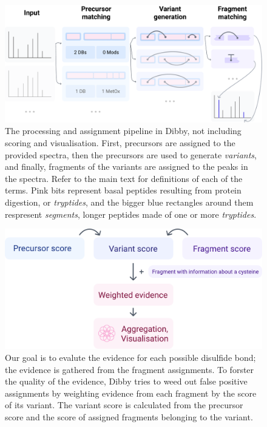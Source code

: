 \begin{figure}
  \centering
  \includegraphics[width=\linewidth]{img/pipeline.pdf}
  \caption{The processing and assignment pipeline in Dibby, not including scoring and visualisation. First, precursors are assigned to the provided spectra, then the precursors are used to generate \emph{variants}, and finally, fragments of the variants are assigned to the peaks in the spectra. Refer to the main text for definitions of each of the terms. Pink bits represent basal peptides resulting from protein digestion, or \emph{tryptides}, and the bigger blue rectangles around them respresent \emph{segments}, longer peptides made of one or more \emph{tryptides}.}\label{fig:pipeline}

\end{figure}

\begin{figure}
  \centering
  \includegraphics[width=0.75\linewidth]{img/score-calculation.pdf}
  \caption{Our goal is to evalute the evidence for each possible disulfide bond; the evidence is gathered from the fragment assignments. To forster the quality of the evidence, Dibby tries to weed out false positive assignments by weighting evidence from each fragment by the score of its variant. The variant score is calculated from the precursor score and the score of assigned fragments belonging to the variant.}\label{fig:score-calculation}
\end{figure}


